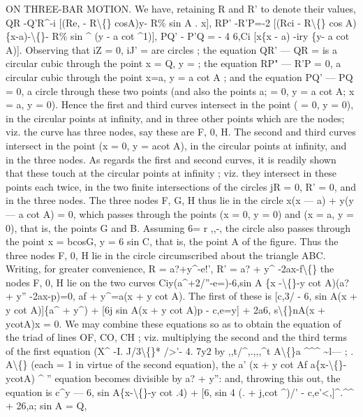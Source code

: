 \documentclass[12pt,a4paper]{article}
\begin{document}
ON THREE-BAR MOTION.
We
have, retaining R and R'
to denote
their
values,
QR -Q'R\textasciicircum{}-i [(Re, - R\textbackslash\{\} cosA)y- R\% sin A
. x],
RP' -R'P=-2 [(Rci - R\textbackslash\{\} cos A) \{x-a)-\textbackslash\{\}- R\% sin \textasciicircum{} (y - a cot \textasciicircum{}1)],
PQ' - P'Q = - 4 6,Ci [x\{x - a) -iry \{y- a cot A)].
Observing
that
iZ = 0,
iJ' =
are
circles
;
the
equation QR' --- QR =
is a circular
cubic
through
the
point
x = Q,
y =
;
the
equation RP" --- R'P = 0,
a
circular
cubic
through
the
point x=a,
y = a cot A
;
and
the
equation PQ' --- PQ = 0, a
circle
through
these
two
points
(and
also
the
points
a; = 0,
y = a cot A;
x = a,
y = 0).
Hence
the
first
and
third
curves
intersect
in
the
point
(\guillemotleft{} = 0,
y = 0),
in
the
circular
points
at
infinity, and
in three other points which
are the nodes;
viz.
the
curve
has
three
nodes,
say
these
are
F,
0,
H.
The
second
and
third
curves
intersect
in
the
point
(x = 0,
y = acot A),
in the
circular points
at
infinity, and
in the
three
nodes.
As
regards
the
first
and second
curves,
it
is
readily shown
that
these
touch
at
the
circular
points
at
infinity
;
viz.
they
intersect
in
these
points each
twice,
in the two
finite
intersections
of
the
circles
jR = 0, R' = 0, and
in the three
nodes.
The three nodes F,
G, H thus
lie in the
circle
x(x --- a) + y(y --- a cot A) = 0,
which
passes
through
the
points
(x = 0,
y = 0)
and
(x = a,
y = 0),
that
is,
the
points
G and
B.
Assuming 6=
r
,,-,
the
circle
also
passes
through
the
point x = bcosG,
y = 6 sin C,
that
is,
the
point A
of the
figure.
Thus
the
three
nodes F,
0, H
lie
in
the
circle circumscribed about the triangle ABC.
Writing,
for greater convenience,
R = a?+y\textasciicircum{}-e!', R' = a? + y\textasciicircum{} -2ax-f\textbackslash\{\}
the nodes F, 0, H
lie on the two curves
Ciy(a\textasciicircum{}+2/''-e=)-6,sin A \{x -\textbackslash\{\}-y cot A)(a? + y'' -2ax-p)=0,
af + y\textasciicircum{}=a(x + y cot A).
The
first of these
is
[c,3/ - 6, sin A(x + y cot A)]\{a\textasciicircum{} + y\textasciicircum{})
+ [6j sin A(x + y cot A)p - c,e=y]
+ 2a6, s\textbackslash\{\}nA(x + ycotA)x = 0.
We may
combine
these
equations
so
as
to
obtain
the
equation
of
the
triad
of
lines OF, CO, CH
;
viz. multiplying the second and
the
third
terms
of the
first
equation
(X\textasciicircum{} -I. \textbullet{}J/3\textbackslash\{\}*
/\guillemotright{}>'- 4. 7y2
by
,,t/\textasciicircum{},.,,,\textasciicircum{}t
A\textbackslash\{\}a
\textasciicircum{}\textasciicircum{}\textasciicircum{}
\textasciitilde{}l---
;
.
A\textbackslash\{\}
(each = 1
in
virtue of
the second
equation), the
a' (x + y cot Af
a\{x-\textbackslash\{\}-ycotA)
\textasciicircum{}
''
equation becomes
divisible by
a? + y'':
and, throwing
this out, the equation
is
c\textasciicircum{}y --- 6, sin A\{x-\textbackslash\{\}-y cot .4)
+ [6, sin 4 (. + j,cot \textasciicircum{})/' - c,e'<,]\textasciicircum{}.\textasciicircum{}\textasciicircum{}
+ 26,a; sin A = Q,
\end{document}
